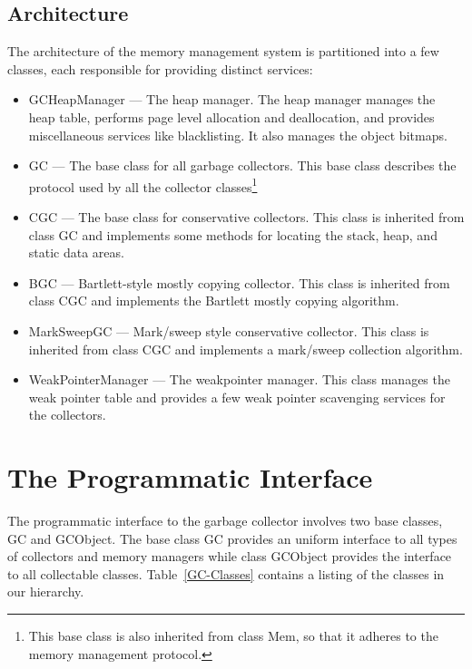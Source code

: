 \subsection{Architecture}

   The architecture of the memory management system is partitioned into
a few classes, each responsible for providing distinct services:

\begin{itemize}
   \item {\sf GCHeapManager} --- The heap manager.  The heap manager
    manages the heap table, performs page level
    allocation and deallocation, and provides miscellaneous services
    like blacklisting.  It also manages the object bitmaps.
   \item {\sf GC} --- The base class for all garbage collectors.
    This base class describes the protocol used by all the collector
    classes\footnote{This base class is also inherited from class
    {\sf Mem}, so that it adheres to the \ADLib{} memory management
    protocol.}
   \item {\sf CGC} --- The base class for conservative collectors.
     This class is inherited from class {\sf GC} and implements some
     methods for locating the stack, heap, and static data areas.
   \item {\sf BGC} --- Bartlett-style mostly copying collector.
      This class is inherited from class {\sf CGC} and implements
      the Bartlett mostly copying algorithm.
   \item {\sf MarkSweepGC} --- Mark/sweep style conservative collector.
      This class is inherited from class {\sf CGC} and implements
      a mark/sweep collection algorithm.
   \item {\sf WeakPointerManager} --- The weakpointer manager.
      This class manages the weak pointer table and provides a few
      weak pointer scavenging services for the collectors.
\end{itemize}
  
\section{The Programmatic Interface}

   The programmatic interface to the garbage collector involves two
base classes, {\sf GC} and {\sf GCObject}.  The base class {\sf GC}
provides an uniform interface to all types of collectors and memory
managers while class {\sf GCObject} provides the interface to all 
collectable classes.  Table~\ref{GC-Classes} contains a listing
of the classes in our hierarchy.

